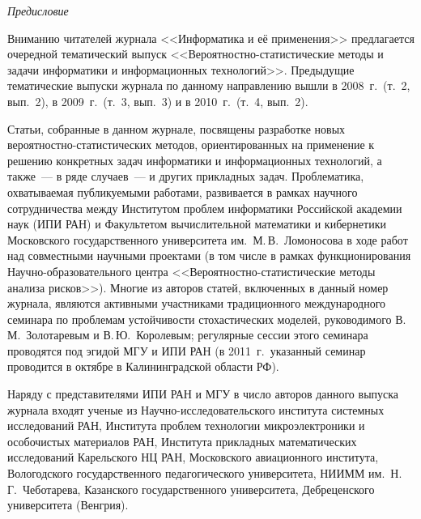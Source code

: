    { %
   { %
   
   \vspace*{-48pt}
   \begin{center}\LARGE
   \textit{Предисловие}
   \end{center}
   
   
   \vspace*{25mm}
   
   \thispagestyle{empty}
   
   { %

    
Вниманию читателей журнала <<Информатика и её применения>> предлагается 
очередной тематический выпуск <<Вероятностно-статистические методы и 
задачи информатики и информационных технологий>>. Предыдущие тематические 
выпуски журнала по данному направлению вышли в 2008~г.\ (т.~2, вып.~2), 
в 2009~г.\ (т.~3, вып.~3) и в 2010~г.\ (т.~4, вып.~2). 

Статьи, собранные в данном журнале, посвящены разработке новых вероятностно-статистических 
методов, ориентированных на применение к решению конкретных задач информатики и информационных 
технологий, а также~--- в ряде случаев~--- и других прикладных задач. Проблематика, охватываемая 
публикуемыми работами, развивается в рамках научного сотрудничества между Институтом проблем 
информатики Российской академии наук (ИПИ РАН) и Факультетом вычислительной математики и 
кибернетики Московского государственного университета им.\ М.\,В.~Ломоносова в ходе работ 
над совместными научными проектами (в том числе в рамках функционирования 
Научно-образовательного центра <<Вероятностно-статистические методы анализа рисков>>). 
Многие из авторов статей, включенных в данный номер журнала, являются активными участниками 
традиционного международного семинара по проблемам устойчивости стохастических моделей, 
руководимого В.\,М.~Золотаревым и В.\,Ю.~Королевым; регулярные сессии этого семинара 
проводятся под эгидой МГУ и ИПИ РАН (в 2011~г.\ указанный семинар проводится в октябре 
в Калининградской области РФ). 

Наряду с представителями ИПИ РАН и МГУ в число авторов данного выпуска журнала входят 
ученые из Научно-исследовательского института системных исследований РАН, Института 
проблем технологии микроэлектроники и особочистых материалов РАН, Института 
прикладных математических исследований Карельского НЦ РАН, Московского 
авиационного института, Вологодского государственного педагогического университета, 
НИИММ им.\ Н.\,Г.~Чеботарева, Казанского государственного университета, Дебреценского 
университета (Венгрия).

}}}
